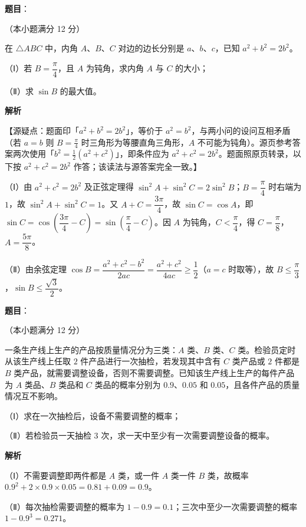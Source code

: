 \begin{answer}

\textbf{题目}：

（本小题满分 12 分）

在 $\triangle ABC$ 中，内角 $A$、$B$、$C$ 对边的边长分别是 $a$、$b$、$c$，已知 $a^2+b^2=2b^2$。

（Ⅰ）若 $B=\dfrac{\pi}4$，且 $A$ 为钝角，求内角 $A$ 与 $C$ 的大小；

（Ⅱ）求 $\sin B$ 的最大值。

\textbf{解析}

【源疑点：题面印「$a^2+b^2=2b^2$」，等价于 $a^2=b^2$，与两小问的设问互相矛盾（若 $a=b$ 则 $B=\frac\pi4$ 时三角形为等腰直角三角形，$A$ 不可能为钝角）。源页参考答案两次使用「$b^2=\frac12(a^2+c^2)$」，即条件应为 $a^2+c^2=2b^2$。题面照原页转录，以下按 $a^2+c^2=2b^2$ 作答；该读法与源答案完全一致。】

（Ⅰ）由 $a^2+c^2=2b^2$ 及正弦定理得 $\sin^2A+\sin^2C=2\sin^2B$；$B=\dfrac\pi4$ 时右端为 $1$，故 $\sin^2A+\sin^2C=1$。又 $A+C=\dfrac{3\pi}4$，故 $\sin C=\cos A$，即 $\sin C=\cos\left(\dfrac{3\pi}4-C\right)=\sin\left(\dfrac\pi4-C\right)$。因 $A$ 为钝角，$C<\dfrac\pi4$，得 $C=\dfrac\pi8$，$A=\dfrac{5\pi}8$。

（Ⅱ）由余弦定理 $\cos B=\dfrac{a^2+c^2-b^2}{2ac}=\dfrac{a^2+c^2}{4ac}\geqslant\dfrac12$（$a=c$ 时取等），故 $B\leqslant\dfrac\pi3$，$\sin B\leqslant\dfrac{\sqrt3}2$。


\end{answer}
\begin{answer}

\textbf{题目}：

（本小题满分 12 分）

一条生产线上生产的产品按质量情况分为三类：$A$ 类、$B$ 类、$C$ 类。检验员定时从该生产线上任取 $2$ 件产品进行一次抽检，若发现其中含有 $C$ 类产品或 $2$ 件都是 $B$ 类产品，就需要调整设备，否则不需要调整。已知该生产线上生产的每件产品为 $A$ 类品、$B$ 类品和 $C$ 类品的概率分别为 $0.9$、$0.05$ 和 $0.05$，且各件产品的质量情况互不影响。

（Ⅰ）求在一次抽检后，设备不需要调整的概率；

（Ⅱ）若检验员一天抽检 $3$ 次，求一天中至少有一次需要调整设备的概率。

\textbf{解析}

（Ⅰ）不需要调整即两件都是 $A$ 类，或一件 $A$ 类一件 $B$ 类，故概率 $0.9^2+2\times0.9\times0.05=0.81+0.09=0.9$。

（Ⅱ）每次抽检需要调整的概率为 $1-0.9=0.1$；三次中至少一次需要调整的概率 $1-0.9^3=0.271$。


\end{answer}
